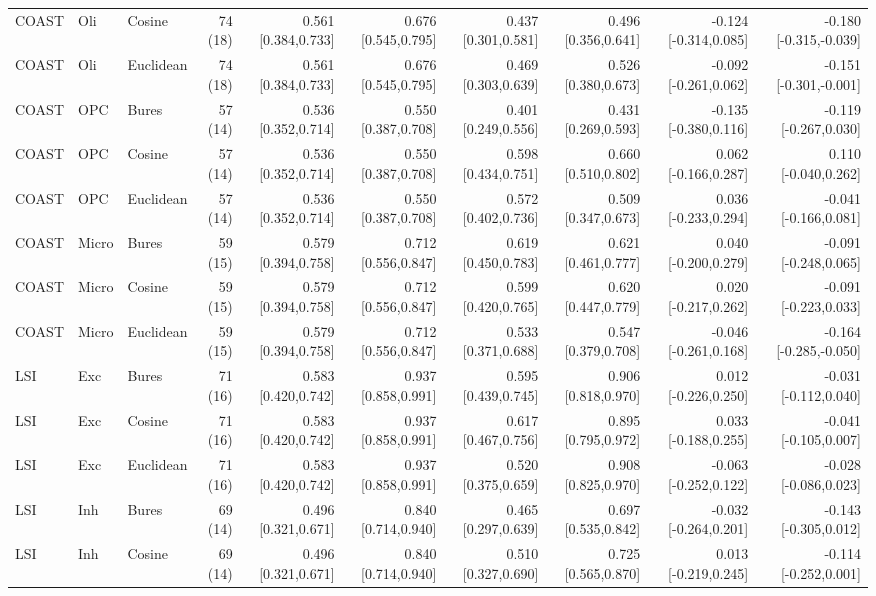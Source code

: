 \documentclass[9pt]{article}
\begin{document}
\begin{landscape}
\begin{longtable}{lllrrrrrrr}
COAST & Oli & Cosine & 74 (18) & 0.561 [0.384,0.733] & 0.676 [0.545,0.795] & 0.437 [0.301,0.581] & 0.496 [0.356,0.641] & -0.124 [-0.314,0.085] & -0.180 [-0.315,-0.039] \\
COAST & Oli & Euclidean & 74 (18) & 0.561 [0.384,0.733] & 0.676 [0.545,0.795] & 0.469 [0.303,0.639] & 0.526 [0.380,0.673] & -0.092 [-0.261,0.062] & -0.151 [-0.301,-0.001] \\
COAST & OPC & Bures & 57 (14) & 0.536 [0.352,0.714] & 0.550 [0.387,0.708] & 0.401 [0.249,0.556] & 0.431 [0.269,0.593] & -0.135 [-0.380,0.116] & -0.119 [-0.267,0.030] \\
COAST & OPC & Cosine & 57 (14) & 0.536 [0.352,0.714] & 0.550 [0.387,0.708] & 0.598 [0.434,0.751] & 0.660 [0.510,0.802] & 0.062 [-0.166,0.287] & 0.110 [-0.040,0.262] \\
COAST & OPC & Euclidean & 57 (14) & 0.536 [0.352,0.714] & 0.550 [0.387,0.708] & 0.572 [0.402,0.736] & 0.509 [0.347,0.673] & 0.036 [-0.233,0.294] & -0.041 [-0.166,0.081] \\
COAST & Micro & Bures & 59 (15) & 0.579 [0.394,0.758] & 0.712 [0.556,0.847] & 0.619 [0.450,0.783] & 0.621 [0.461,0.777] & 0.040 [-0.200,0.279] & -0.091 [-0.248,0.065] \\
COAST & Micro & Cosine & 59 (15) & 0.579 [0.394,0.758] & 0.712 [0.556,0.847] & 0.599 [0.420,0.765] & 0.620 [0.447,0.779] & 0.020 [-0.217,0.262] & -0.091 [-0.223,0.033] \\
COAST & Micro & Euclidean & 59 (15) & 0.579 [0.394,0.758] & 0.712 [0.556,0.847] & 0.533 [0.371,0.688] & 0.547 [0.379,0.708] & -0.046 [-0.261,0.168] & -0.164 [-0.285,-0.050] \\
LSI & Exc & Bures & 71 (16) & 0.583 [0.420,0.742] & 0.937 [0.858,0.991] & 0.595 [0.439,0.745] & 0.906 [0.818,0.970] & 0.012 [-0.226,0.250] & -0.031 [-0.112,0.040] \\
LSI & Exc & Cosine & 71 (16) & 0.583 [0.420,0.742] & 0.937 [0.858,0.991] & 0.617 [0.467,0.756] & 0.895 [0.795,0.972] & 0.033 [-0.188,0.255] & -0.041 [-0.105,0.007] \\
LSI & Exc & Euclidean & 71 (16) & 0.583 [0.420,0.742] & 0.937 [0.858,0.991] & 0.520 [0.375,0.659] & 0.908 [0.825,0.970] & -0.063 [-0.252,0.122] & -0.028 [-0.086,0.023] \\
LSI & Inh & Bures & 69 (14) & 0.496 [0.321,0.671] & 0.840 [0.714,0.940] & 0.465 [0.297,0.639] & 0.697 [0.535,0.842] & -0.032 [-0.264,0.201] & -0.143 [-0.305,0.012] \\
LSI & Inh & Cosine & 69 (14) & 0.496 [0.321,0.671] & 0.840 [0.714,0.940] & 0.510 [0.327,0.690] & 0.725 [0.565,0.870] & 0.013 [-0.219,0.245] & -0.114 [-0.252,0.001] \\

\end{longtable}
\end{landscape}
\end{document}
